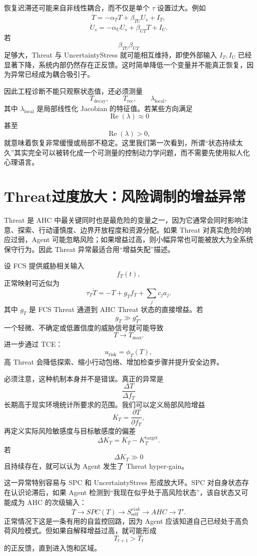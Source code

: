 恢复迟滞还可能来自非线性耦合，而不仅是单个 $\tau$ 设置过大。例如
\[
\dot T
=
-\alpha_T T
+
\beta_{TU}U_s
+
I_T,
\]
\[
\dot U_s
=
-\alpha_U U_s
+
\beta_{UT}T
+
I_U.
\]
若
\[
\beta_{TU}\beta_{UT}
\]
足够大，Threat 与 UncertaintyStress 就可能相互维持，即使外部输入 $I_T,I_U$ 已经显著下降，系统内部仍然存在正反馈。这时简单降低一个变量并不能真正恢复，因为异常已经成为耦合吸引子。

因此工程诊断不能只观察状态值，还必须测量
\[
T_{\mathrm{decay}},
\qquad
T_{\mathrm{rec}},
\qquad
\lambda_{\mathrm{local}},
\]
其中 $\lambda_{\mathrm{local}}$ 是局部线性化 Jacobian 的特征值。若某些方向满足
\[
\operatorname{Re}(\lambda)\approx0
\]
甚至
\[
\operatorname{Re}(\lambda)>0,
\]
就意味着恢复非常缓慢或局部不稳定。这里我们第一次看到，所谓“状态持续太久”其实完全可以被转化成一个可测量的控制动力学问题，而不需要先使用拟人化心理语言。

\section{Threat过度放大：风险调制的增益异常}
\label{sec:ahc_threat_amplification}

Threat 是 AHC 中最关键同时也是最危险的变量之一，因为它通常会同时影响注意、探索、行动谨慎度、边界开放程度和资源分配。如果 Threat 对真实危险的响应过弱，Agent 可能忽略风险；如果增益过高，则小幅异常也可能被放大为全系统保守行为。因此 Threat 异常最适合用“增益失配”描述。

设 FCS 提供威胁相关输入
\[
f_T(t),
\]
正常映射可近似为
\[
\tau_T\dot T
=
-T
+
g_Tf_T
+
\sum_j c_j a_j.
\]
其中 $g_T$ 是 FCS Threat 通道到 AHC Threat 状态的直接增益。若
\[
g_T\gg g_T^\star,
\]
一个轻微、不确定或低置信度的威胁信号就可能导致
\[
T\rightarrow T_{\max}.
\]
进一步通过 TCE：
\[
u_{\mathrm{risk}}
=
\phi_T(T),
\]
高 Threat 会降低探索、缩小行动包络、增加检查步骤并提升安全边界。

必须注意，这种机制本身并不是错误。真正的异常是
\[
\frac{\Delta T}{\Delta f_T}
\]
长期高于现实环境统计所要求的范围。我们可以定义局部风险增益
\[
K_T
=
\frac{\partial T}{\partial f_T},
\]
再定义实际风险敏感度与目标敏感度的偏差
\[
\Delta K_T
=
K_T-K_T^{\mathrm{target}}.
\]
若
\[
\Delta K_T\gg0
\]
且持续存在，就可以认为 Agent 发生了 Threat hyper-gain。

这一异常特别容易与 SPC 和 UncertaintyStress 形成放大环。SPC 对自身状态存在认识论滞后，如果 Agent 检测到“我现在似乎处于高风险状态”，该自状态又可能成为 AHC 的次级输入：
\[
T
\rightarrow
SPC(T)
\rightarrow
S_{\mathrm{self}}^{risk}
\rightarrow
AHC
\rightarrow
T'.
\]
正常情况下这是一条有用的自监控回路，因为 Agent 应该知道自己已经处于高负荷风险模式。但如果自解释增益过高，就可能形成
\[
T_{t+1}>T_t
\]
的正反馈，直到进入饱和区域。

